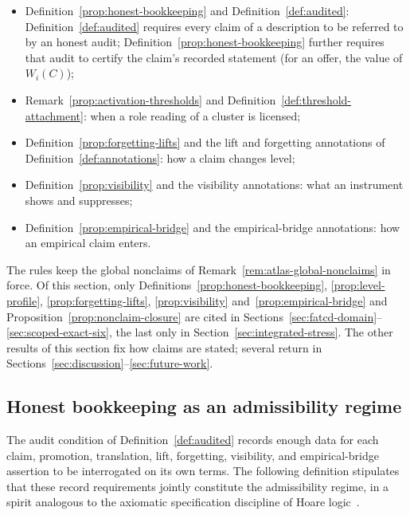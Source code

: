 \documentclass[11pt]{article}
\theoremstyle{definition}
\begin{document}
\begin{itemize}[topsep=2pt,itemsep=1pt]
  \item Definition~\ref{prop:honest-bookkeeping} and
    Definition~\ref{def:audited}: Definition~\ref{def:audited} requires every
    claim of a description to be referred to by an honest audit;
    Definition~\ref{prop:honest-bookkeeping} further requires that audit to
    certify the claim's recorded statement (for an offer, the value of
    \(W_i(C)\));
  \item Remark~\ref{prop:activation-thresholds} and
    Definition~\ref{def:threshold-attachment}: when a role reading of a
    cluster is licensed;
  \item Definition~\ref{prop:forgetting-lifts} and the lift and forgetting
    annotations of Definition~\ref{def:annotations}: how a claim changes
    level;
  \item Definition~\ref{prop:visibility} and the visibility annotations:
    what an instrument shows and suppresses;
  \item Definition~\ref{prop:empirical-bridge} and the empirical-bridge
    annotations: how an empirical claim enters.
\end{itemize} The rules keep the global
nonclaims of Remark~\ref{rem:atlas-global-nonclaims} in force. Of this section, only
Definitions~\ref{prop:honest-bookkeeping}, \ref{prop:level-profile},
\ref{prop:forgetting-lifts}, \ref{prop:visibility}
and~\ref{prop:empirical-bridge} and Proposition~\ref{prop:nonclaim-closure}
are cited in Sections~\ref{sec:fatcd-domain}--\ref{sec:scoped-exact-six}, the
last only in Section~\ref{sec:integrated-stress}. The other results of this section
fix how claims are stated; several return in
Sections~\ref{sec:discussion}--\ref{sec:future-work}.

\subsection{Honest bookkeeping as an admissibility regime}\label{subsec:honest-bookkeeping}

The audit condition of Definition~\ref{def:audited} records enough
data for each claim, promotion, translation, lift, forgetting,
visibility, and empirical-bridge assertion to be interrogated on its
own terms. The following definition stipulates that these record
requirements jointly constitute the admissibility regime, in a spirit
analogous to the axiomatic specification discipline of Hoare
logic~\citep{Hoare1969}.
\end{document}

